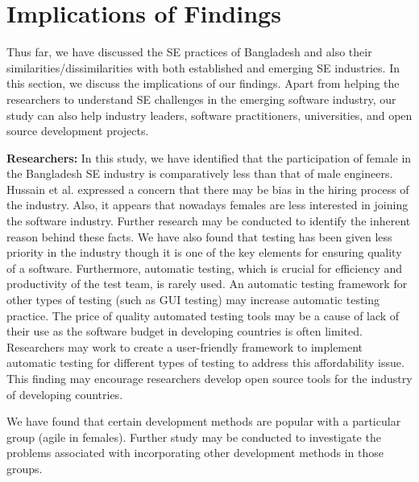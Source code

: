 \section{Implications of Findings}


\label{implications}
Thus far, we have discussed the SE practices of Bangladesh and also their similarities/dissimilarities with both established and emerging SE industries. In this section, we discuss the implications of our findings. Apart from helping the researchers to understand SE challenges in the emerging software industry, our study can also help industry leaders, software practitioners, universities, and open source development projects.

\indent \textbf{Researchers:} In this study, we have identified that the participation of female in the Bangladesh SE industry is comparatively less than that of male engineers.  Hussain et al.\cite{Hussain2020} expressed a concern that there may be bias in the hiring process of the industry. Also, it appears that nowadays females are less interested in joining the software industry. Further research may be conducted to identify the inherent reason behind these facts. We have also found that testing has been given less priority in the industry though it is one of the key elements for ensuring quality of a software. Furthermore, automatic testing, which is crucial for efficiency and productivity of the test team, is rarely used. An automatic testing framework for other types of testing (such as GUI testing) may increase automatic testing practice.  The price of quality automated testing tools may be a cause of lack of their use as the software budget in developing countries is often limited. Researchers may work to create a user-friendly framework to implement automatic testing for different types of testing to address this affordability issue. This finding may encourage researchers develop open source tools for the industry of developing countries. 

We have found that certain development methods are popular with a particular group (agile in females). Further study may be conducted to investigate the problems associated with incorporating other development methods in those groups. 


